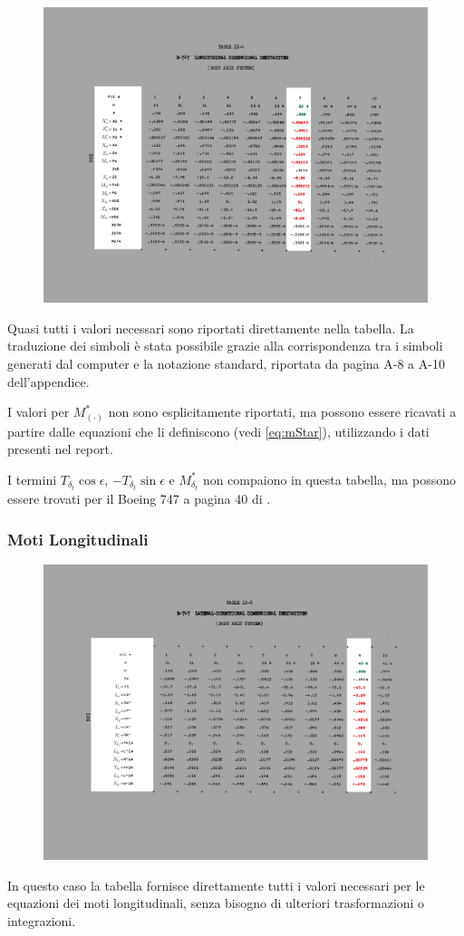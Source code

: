 \begin{figure}[H]
    \centering
    \includegraphics[width=1\linewidth]{Immagini/230.jpg}
\end{figure}

Quasi tutti i valori necessari sono riportati direttamente nella tabella. La traduzione dei simboli è stata possibile grazie alla corrispondenza tra i simboli generati dal computer e la notazione standard, riportata da pagina A-8 a A-10 dell'appendice.

I valori per $M_{(\cdot)}^*$ non sono esplicitamente riportati, ma possono essere ricavati a partire dalle equazioni che li definiscono (vedi \eqref{eq:mStar}), utilizzando i dati presenti nel report.

I termini $T_{\delta_t}\cos\epsilon$, $-T_{\delta_t}\sin\epsilon$ e $M_{\delta_t}^*$ non compaiono in questa tabella, ma possono essere trovati per il Boeing 747 a pagina 40 di \cite{sanches_dynamic_stability_747}.

\subsubsection*{Moti Longitudinali}

\begin{figure}[H]
    \centering
    \includegraphics[width=1\linewidth]{Immagini/234.jpg}
\end{figure}

In questo caso la tabella fornisce direttamente tutti i valori necessari per le equazioni dei moti longitudinali, senza bisogno di ulteriori trasformazioni o integrazioni.
